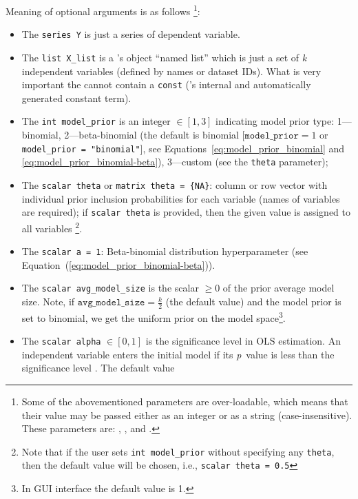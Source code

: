 Meaning of optional arguments is as follows%
	\footnote{Some of the abovementioned parameters are
		over-loadable, which means that their value may be
		passed either as an integer or as a string (case-insensitive).
		These parameters are: ,
		, and .}:
\begin{itemize}
	\item The \lstinline!series Y! is just a series of dependent variable.
	\item The \lstinline!list X_list! is a 's
		object ``named list'' which is just a set of \textit{k}
		independent variables (defined by names or dataset IDs).
		What is very important the  cannot contain a
		\texttt{const} ('s internal and automatically
		generated constant term).
	\item The \lstinline!int model_prior! is an integer $\in [1,3]$
		indicating model prior type: 1---binomial, 2---beta-binomial
		(the default is binomial [$\mathtt{model\_prior}=1$ or
		\texttt{model\_prior = "binomial"}], see
		Equations~\ref{eq:model_prior_binomial}
		and \ref{eq:model_prior_binomial-beta}), 3---custom
		(see the \lstinline!theta! parameter);
	\item The \lstinline!scalar theta! or \lstinline!matrix theta = {NA}!:\label{opts:theta}
		column or row vector with individual prior inclusion
		probabilities for each variable (names of variables are
		required); if \lstinline!scalar theta! is provided,
		then the given value is assigned to all variables%
		\footnote{Note that if the user sets
			\lstinline!int model_prior! without specifying
			any \lstinline!theta!, then the default value
			will be chosen, i.e., \lstinline!scalar theta = 0.5!}.
	\item The \lstinline!scalar a = 1!: Beta-binomial distribution\label{opts:a}
		hyperparameter (see Equation~(\ref{eq:model_prior_binomial-beta})).
	\item The \lstinline!scalar avg_model_size! is the scalar $\geq0$
		of the prior average model size. Note, if
		$\mathtt{avg\_model\_size} = \frac{k}{2}$ (the default value)
		and the model prior is set to binomial, we get the uniform prior
		on the model space\footnote{In GUI interface the default value is 1.}.
	\item The \lstinline!scalar alpha! $\in [0,1]$ is the significance
		level in OLS estimation. An independent variable enters the
		initial model if its \textit{p}~value is less than the
		significance level \citep[see][]{Koop2003}. The default value

\end{itemize}

